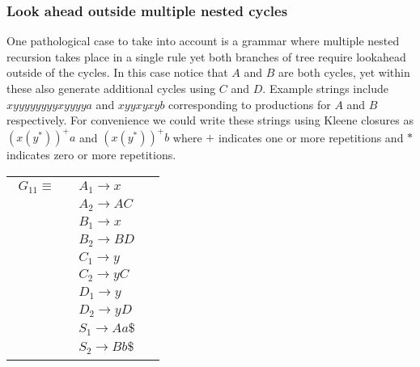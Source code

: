\documentclass[envcountsame,runningheads]{llncs}
\begin{document}
\subsubsection{Look ahead outside multiple nested cycles}
One pathological case to take into account is a grammar where multiple nested recursion takes place in a single rule yet both branches of tree require lookahead outside of the cycles. In this case notice that $A$ and $B$ are both 
cycles, yet within these also generate additional cycles using $C$ and $D$. Example strings include $xyyyyyyyyxyyyya$ and $xyyxyxyb$ corresponding to productions for $A$ and $B$ respectively.
For convenience we could write these strings using Kleene closures as $(x(y^*))^+a$ and $(x(y^*))^+b$ where $+$ indicates one or more repetitions and $*$ indicates zero or more repetitions.

\begin{tabular}[t]{cl}
\parbox{.3\textwidth}{
\begin{align*}
G_{11} \equiv \quad & A_1 \rightarrow x\\
                  & A_2 \rightarrow A C \\
                  & B_1 \rightarrow x\\
                  & B_2 \rightarrow B D\\
                  & C_1 \rightarrow y\\
                  & C_2 \rightarrow y C\\
                  & D_1 \rightarrow y\\
                  & D_2 \rightarrow y D\\
                  & S_1 \rightarrow A a \$\\
                  & S_2 \rightarrow B b \$
\end{align*}}
\parbox{.6\textwidth}{}
\end{tabular}
\end{document}
